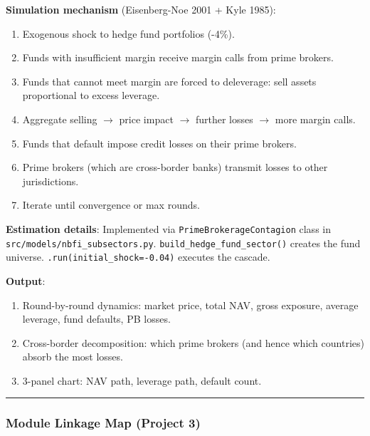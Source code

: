 \documentclass[11pt,a4paper]{article}
\begin{document}
\textbf{Simulation mechanism} (Eisenberg-Noe 2001 + Kyle 1985):
\begin{enumerate}
\item Exogenous shock to hedge fund portfolios (-4\%).
\item Funds with insufficient margin receive margin calls from prime brokers.
\item Funds that cannot meet margin are forced to deleverage: sell assets proportional to excess leverage.
\item Aggregate selling $\rightarrow$ price impact $\rightarrow$ further losses $\rightarrow$ more margin calls.
\item Funds that default impose credit losses on their prime brokers.
\item Prime brokers (which are cross-border banks) transmit losses to other jurisdictions.
\item Iterate until convergence or max rounds.

\end{enumerate}
\textbf{Estimation details}: Implemented via \texttt{PrimeBrokerageContagion} class in \texttt{src/models/nbfi\_subsectors.py}. \texttt{build\_hedge\_fund\_sector()} creates the fund universe. \texttt{.run(initial\_shock=-0.04)} executes the cascade.

\textbf{Output}:
\begin{enumerate}
\item Round-by-round dynamics: market price, total NAV, gross exposure, average leverage, fund defaults, PB losses.
\item Cross-border decomposition: which prime brokers (and hence which countries) absorb the most losses.
\item 3-panel chart: NAV path, leverage path, default count.

\end{enumerate}

\bigskip\noindent\rule{\textwidth}{0.4pt}\bigskip


\subsubsection{Module Linkage Map (Project 3)}
\end{document}
